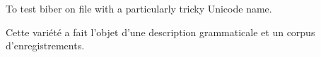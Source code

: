 \documentclass{article}
\begin{document}
To test biber on file with a particularly tricky Unicode name.

Cette variété a fait l'objet d'une description grammaticale \parencite{jacques21grammar} et un corpus d'enregistrements.

\printbibliography
\end{document}
